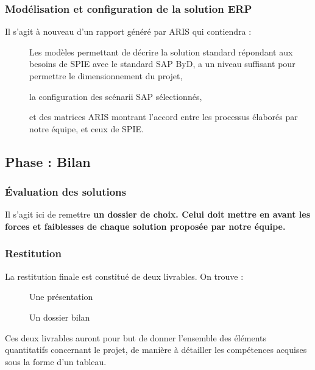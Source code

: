 \subsubsection{Modélisation et configuration de la solution ERP}

Il s’agit à nouveau d’un rapport généré par ARIS qui contiendra : \\

\begin{description}
    \item[\textbullet] Les modèles permettant de décrire la solution standard répondant aux besoins de SPIE avec le standard SAP ByD, a un niveau suffisant pour permettre le dimensionnement du projet, 
    \item[\textbullet] la configuration des scénarii SAP sélectionnés,
    \item[\textbullet] et des matrices ARIS montrant l’accord entre les processus élaborés par notre équipe, et ceux de SPIE.
\end{description}

\subsection{Phase : Bilan}

\subsubsection{Évaluation des solutions}

Il s’agit ici de remettre \bf{un dossier de choix}. Celui doit mettre en avant les forces et faiblesses de chaque solution proposée par notre équipe.

\subsubsection{Restitution}

La restitution finale est constitué de deux livrables. On trouve : \\

\begin{description}
    \item[\textbullet] Une présentation
    \item[\textbullet] Un dossier bilan \\
\end{description}

Ces deux livrables auront pour but de donner l’ensemble des éléments quantitatifs concernant le projet, de manière à détailler les compétences acquises sous la forme d’un tableau.
